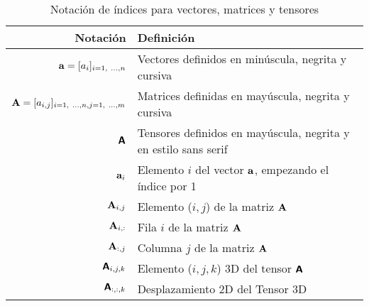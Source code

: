\begin{table}[H]
    \begin{center}
        \begin{tabularx}{\textwidth}{|r|X|}
            \hline
            \textbf{Notación}                                                 & \textbf{Definición}                                                 \\
            \hline
            $ \mathit{\mathbf{{a}}} = [a_{i}]_{i=1, ~\ldots, n} $                    & Vectores definidos en minúscula, negrita y cursiva                  \\
            $ \mathit{\mathbf{{A}}} = [a_{i,j}]_{i=1, ~\ldots, n, j=1, ~\ldots, m} $ & Matrices definidas en mayúscula, negrita y cursiva                  \\
            $ \boldsymbol{\mathsf{{A}}} $                                                & Tensores definidos en mayúscula, negrita y en estilo sans serif     \\
            \hline
            ${ \mathit{\mathbf{{a}}}_{i} }$                                          & Elemento $i$ del vector $\mathit{\mathbf{{a}}}$, empezando el índice por 1 \\
            ${ \mathit{\mathbf{{A}}}_{i,j} }$                                        & Elemento ($i,j$) de la matriz $\mathit{\mathbf{{A}}}$                      \\
            ${ \mathit{\mathbf{{A}}}_{i,:} }$                                        & Fila $i$ de la matriz $\mathit{\mathbf{{A}}}$                              \\
            ${ \mathit{\mathbf{{A}}}_{:,j} }$                                        & Columna $j$ de la matriz $\mathit{\mathbf{{A}}}$                           \\
            ${ \boldsymbol{\mathsf{{A}}}_{i,j,k} }$                                      & Elemento ($i,j,k$) 3D del tensor $\boldsymbol{\mathsf{{A}}}$                   \\
            ${ \boldsymbol{\mathsf{{A}}}_{:,:,k} }$                                      & Desplazamiento 2D del Tensor 3D                                     \\
            \hline
        \end{tabularx}
        \caption{Notación de índices para vectores, matrices y tensores}
        \label{tab:notation-part-v-1}
    \end{center}
\end{table}

